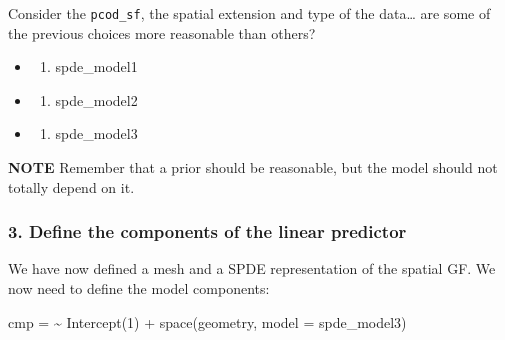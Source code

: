 \documentclass[
  letterpaper,
  DIV=11,
  numbers=noendperiod]{scrartcl}
\newenvironment{Shaded}{\begin{snugshade}}{\end{snugshade}}
\newcommand{\AttributeTok}[1]{\textcolor[rgb]{0.40,0.45,0.13}{#1}}
\newcommand{\DecValTok}[1]{\textcolor[rgb]{0.68,0.00,0.00}{#1}}
\newcommand{\ErrorTok}[1]{\textcolor[rgb]{0.68,0.00,0.00}{#1}}
\newcommand{\FunctionTok}[1]{\textcolor[rgb]{0.28,0.35,0.67}{#1}}
\newcommand{\NormalTok}[1]{\textcolor[rgb]{0.00,0.23,0.31}{#1}}
\newcommand{\OtherTok}[1]{\textcolor[rgb]{0.00,0.23,0.31}{#1}}
\newcommand{\SpecialCharTok}[1]{\textcolor[rgb]{0.37,0.37,0.37}{#1}}
\providecommand{\tightlist}{%
  \setlength{\itemsep}{0pt}\setlength{\parskip}{0pt}}
\begin{document}
\begin{tcolorbox}[enhanced jigsaw, arc=.35mm, bottomrule=.15mm, bottomtitle=1mm, breakable, colback=white, colbacktitle=quarto-callout-tip-color!10!white, colframe=quarto-callout-tip-color-frame, coltitle=black, left=2mm, leftrule=.75mm, opacityback=0, opacitybacktitle=0.6, rightrule=.15mm, title={Question}, titlerule=0mm, toprule=.15mm, toptitle=1mm]

Consider the \texttt{pcod\_sf}, the spatial extension and type of the
data\ldots{} are some of the previous choices more reasonable than
others?

\begin{itemize}
\tightlist
\item
  \begin{enumerate}
  \def\labelenumi{(\Alph{enumi})}
  \tightlist
  \item
    spde\_model1\\
  \end{enumerate}
\item
  \begin{enumerate}
  \def\labelenumi{(\Alph{enumi})}
  \setcounter{enumi}{1}
  \tightlist
  \item
    spde\_model2\\
  \end{enumerate}
\item
  \begin{enumerate}
  \def\labelenumi{(\Alph{enumi})}
  \setcounter{enumi}{2}
  \tightlist
  \item
    spde\_model3
  \end{enumerate}
\end{itemize}

\textbf{NOTE} Remember that a prior should be reasonable, but the model
should not totally depend on it.

\end{tcolorbox}

\subsubsection{3. Define the components of the linear
predictor}\label{define-the-components-of-the-linear-predictor}

We have now defined a mesh and a SPDE representation of the spatial GF.
We now need to define the model components:

\begin{Shaded}
\begin{Highlighting}[]
\NormalTok{cmp }\OtherTok{=} \ErrorTok{\textasciitilde{}} \FunctionTok{Intercept}\NormalTok{(}\DecValTok{1}\NormalTok{) }\SpecialCharTok{+} \FunctionTok{space}\NormalTok{(geometry, }\AttributeTok{model =}\NormalTok{ spde\_model3)}
\end{Highlighting}
\end{Shaded}
\end{document}
